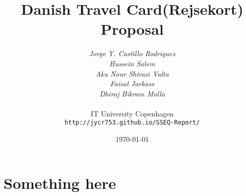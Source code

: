 \documentclass[11pt,a4paper,oneside]{report}
\begin{document}
\title{Danish Travel Card(Rejsekort) Proposal}
\author{\textit{Jorge Y. Castillo Rodriguez}\\
  \textit{Hussein Salem}\\
  \textit{Aku Nour Shirazi Valta}\\
  \textit{Faisal Jarkass}\\
  \textit{Dhiraj Bikram Malla}\\
  \\
  IT University Copenhagen\\
  \texttt{http://jycr753.github.io/SSEQ-Report/}}
\date{\today}
\maketitle
\section*{Something here}
\end{document}
